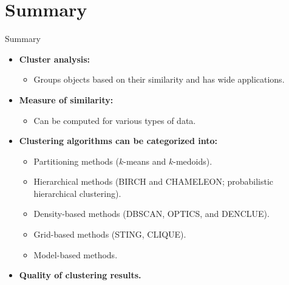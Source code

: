 \section{Summary}

\begin{frame}{Summary}
	\begin{itemize}
		\item \textbf{Cluster analysis:}
		\begin{itemize}
			\item Groups objects based on their similarity and has wide 
			applications.
		\end{itemize}
		\item \textbf{Measure of similarity:}
		\begin{itemize}
			\item Can be computed for various types of data.
		\end{itemize}
		\item \textbf{Clustering algorithms can be categorized into:}
		\begin{itemize}
			\item Partitioning methods ($k$-means and $k$-medoids).
			\item Hierarchical methods (BIRCH and CHAMELEON; probabilistic 
			hierarchical clustering).
			\item Density-based methods (DBSCAN, OPTICS, and DENCLUE).
			\item Grid-based methods (STING, CLIQUE).
			\item Model-based methods.
		\end{itemize}
		\item \textbf{Quality of clustering results.}
	\end{itemize}
\end{frame}
